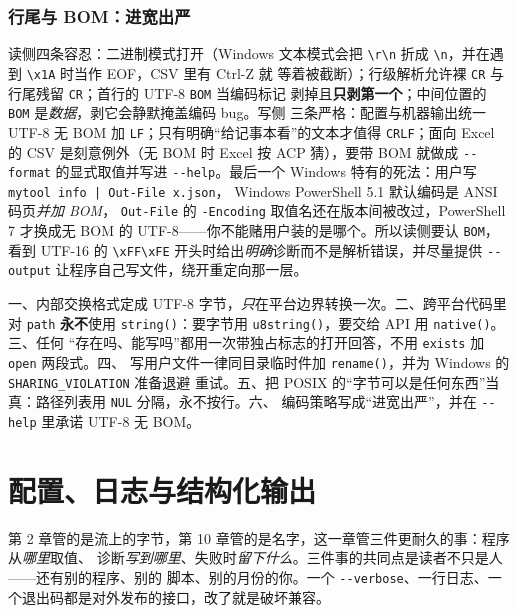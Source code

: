 \documentclass[12pt,a4paper,fontset=fandol]{ctexbook}
\newcommand{\Fn}[1]{\texttt{#1()}}
\newcommand{\Tp}[1]{\texttt{#1}}
\newcommand{\Opt}[1]{\texttt{-\/-#1}}
\newcommand{\Short}[1]{\texttt{-#1}}
\begin{document}
\subsection{行尾与 BOM：进宽出严}

读侧四条容忍：二进制模式打开（Windows 文本模式会把 \Tp{\textbackslash r\textbackslash n}
折成 \Tp{\textbackslash n}，并在遇到 \Tp{\textbackslash x1A} 时当作 EOF，CSV 里有 Ctrl-Z 就
等着被截断）；行级解析允许裸 \Tp{CR} 与行尾残留 \Tp{CR}；首行的 UTF-8 \Tp{BOM} 当编码标记
剥掉且\textbf{只剥第一个}；中间位置的 \Tp{BOM} 是\emph{数据}，剥它会静默掩盖编码 bug。写侧
三条严格：配置与机器输出统一 UTF-8 无 BOM 加 \Tp{LF}；只有明确``给记事本看''的文本才值得
\Tp{CRLF}；面向 Excel 的 CSV 是刻意例外（无 BOM 时 Excel 按 ACP 猜），要带 BOM 就做成
\Opt{format} 的显式取值并写进 \Opt{help}。最后一个 Windows 特有的死法：用户写 \Tp{mytool info | Out-File x.json}，
Windows PowerShell 5.1 默认编码是 ANSI 码页\emph{并加 BOM}，
\Tp{Out-File} 的 \Short{Encoding} 取值名还在版本间被改过，PowerShell 7 才换成无 BOM 的
UTF-8——你不能赌用户装的是哪个。所以读侧要认 \Tp{BOM}，看到 UTF-16 的
\Tp{\textbackslash xFF\textbackslash xFE} 开头时给出\emph{明确}诊断而不是解析错误，并尽量提供 \Opt{output} 让程序自己写文件，绕开重定向那一层。

\begin{bestpractice}[title={路径与编码的六条纪律}]
一、内部交换格式定成 UTF-8 字节，\emph{只}在平台边界转换一次。二、跨平台代码里对 \Tp{path}
\textbf{永不}使用 \Fn{string}：要字节用 \Fn{u8string}，要交给 API 用 \Fn{native}。三、任何
``存在吗、能写吗''都用一次带独占标志的打开回答，不用 \Tp{exists} 加 \Tp{open} 两段式。四、
写用户文件一律同目录临时件加 \Fn{rename}，并为 Windows 的 \Tp{SHARING\_VIOLATION} 准备退避
重试。五、把 POSIX 的``字节可以是任何东西''当真：路径列表用 \Tp{NUL} 分隔，永不按行。六、
编码策略写成``进宽出严''，并在 \Opt{help} 里承诺 UTF-8 无 BOM。
\end{bestpractice}

\chapter{配置、日志与结构化输出}

第 2 章管的是流上的字节，第 10 章管的是名字，这一章管三件更耐久的事：程序从\emph{哪里}取值、
诊断\emph{写到哪里}、失败时\emph{留下什么}。三件事的共同点是读者不只是人——还有别的程序、别的
脚本、别的月份的你。一个 \Opt{verbose}、一行日志、一个退出码都是对外发布的接口，改了就是破坏兼容。
\end{document}
